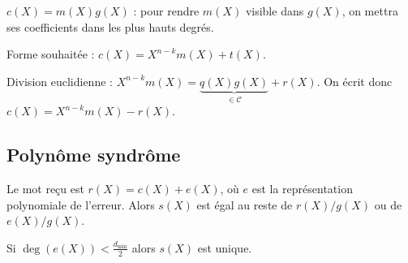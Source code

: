 	$c(X) = m(X)g(X)$ : pour rendre $m(X)$ visible dans $g(X)$, on mettra ses coefficients dans les plus hauts degrés.
	
	Forme souhaitée : $c(X) = X^{n - k} m(X) + t(X)$.
	
	Division euclidienne : $X^{n - k} m(X) = \underset{\in \mathcal{C}}{\underbrace{q(X)g(X)}} + r(X)$.
	On écrit donc $c(X) = X^{n - k} m(X) - r(X)$.


\subsection{Polynôme syndrôme}

	Le mot reçu est $r(X) = c(X) + e(X)$, où $e$ est la représentation polynomiale de l'erreur.
	Alors $s(X)$ est égal au reste de $r(X)/g(X)$ ou de $e(X)/g(X)$.

	Si $\deg(e(X)) < \frac{d_\min}{2}$ alors $s(X)$ est unique.
